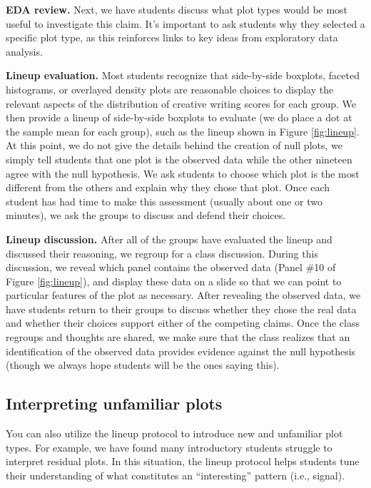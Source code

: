 \documentclass[12pt]{article}
\begin{document}
\textbf{EDA review.} Next, we have students discuss what plot types
would be most useful to investigate this claim. It's important to ask
students why they selected a specific plot type, as this reinforces
links to key ideas from exploratory data analysis.

\textbf{Lineup evaluation.} Most students recognize that side-by-side
boxplots, faceted histograms, or overlayed density plots are reasonable
choices to display the relevant aspects of the distribution of creative
writing scores for each group. We then provide a lineup of side-by-side
boxplots to evaluate (we do place a dot at the sample mean for each
group), such as the lineup shown in Figure \ref{fig:lineup}. At this
point, we do not give the details behind the creation of null plots, we
simply tell students that one plot is the observed data while the other
nineteen agree with the null hypothesis. We ask students to choose which
plot is the most different from the others and explain why they chose
that plot. Once each student has had time to make this assessment
(usually about one or two minutes), we ask the groups to discuss and
defend their choices.

\textbf{Lineup discussion.} After all of the groups have evaluated the
lineup and discussed their reasoning, we regroup for a class discussion.
During this discussion, we reveal which panel contains the observed data
(Panel \#10 of Figure \ref{fig:lineup}), and display these data on a
slide so that we can point to particular features of the plot as
necessary. After revealing the observed data, we have students return to
their groups to discuss whether they chose the real data and whether
their choices support either of the competing claims. Once the class
regroups and thoughts are shared, we make sure that the class realizes
that an identification of the observed data provides evidence against
the null hypothesis (though we always hope students will be the ones
saying this).

\hypertarget{interpreting-unfamiliar-plots}{%
\subsection{Interpreting unfamiliar
plots}\label{interpreting-unfamiliar-plots}}

You can also utilize the lineup protocol to introduce new and unfamiliar
plot types. For example, we have found many introductory students
struggle to interpret residual plots. In this situation, the lineup
protocol helps students tune their understanding of what constitutes an
``interesting'' pattern (i.e., signal).
\end{document}

